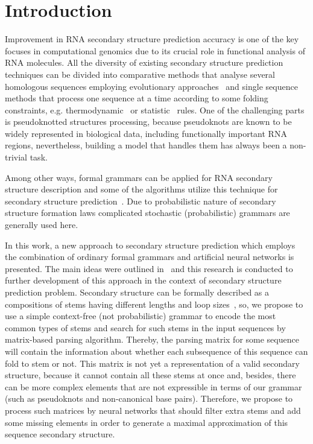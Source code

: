 \documentclass[runningheads]{llncs}
\begin{document}
\section{Introduction}
Improvement in RNA secondary structure prediction accuracy is one of the key focuses in computational genomics due to its crucial role in functional analysis of RNA molecules. All the diversity of existing secondary structure prediction techniques can be divided into comparative methods that analyse several homologous sequences employing evolutionary approaches~\cite{hofacker1999automatic,tahi2002automatic} and single sequence methods that process one sequence at a time according to some folding constraints, e.g. thermodynamic~\cite{hamada2009prediction} or statistic~\cite{eddy1994rna,do2006contrafold} rules. One of the challenging parts is pseudoknotted structures processing, because pseudoknots are known to be widely represented in biological data, including functionally important RNA regions, nevertheless, building a model that handles them has always been a non-trivial task.

Among other ways, formal grammars can be applied for RNA secondary structure description and some of the algorithms utilize this technique for secondary structure prediction~\cite{knudsen2003pfold,nebel2011evaluation}. Due to probabilistic nature of secondary structure formation laws complicated stochastic (probabilistic) grammars are generally used here.

In this work, a new approach to secondary structure prediction which employs the combination of ordinary formal grammars and artificial neural networks is presented. The main ideas were outlined in~\cite{grigorevcomposition,lunina2019secondary} and this research is conducted to further development of this approach in the context of secondary structure prediction problem. Secondary structure can be formally described as a compositions of stems having different lengths and loop sizes~\cite{MQbioinformatics19}, so, we propose to use a simple context-free (not probabilistic) grammar to encode the most common types of stems and search for such stems in the input sequences by matrix-based parsing algorithm. Thereby, the parsing matrix for some sequence will contain the information about whether each subsequence of this sequence can fold to stem or not. This matrix is not yet a representation of a valid secondary structure, because it cannot contain all these stems at once and, besides, there can be more complex elements that are not expressible in terms of our grammar (such as pseudoknots and non-canonical base pairs). Therefore, we propose to process such matrices by neural networks that should filter extra stems and add some missing elements in order to generate a maximal approximation of this sequence secondary structure.
\end{document}
